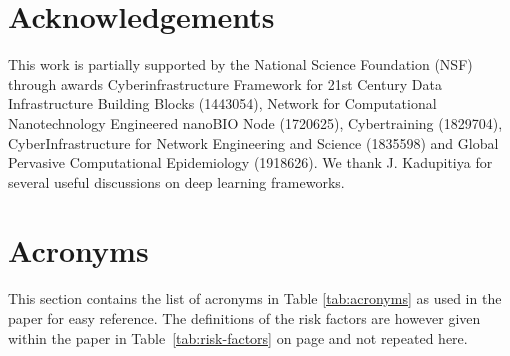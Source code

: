 \documentclass[a4paper, inpress]{jds} %
\renewcommand{\_}{%
    \textunderscore\hspace{0pt}%
}
\begin{document}
\section*{Acknowledgements}

This work is partially supported by the National Science Foundation
(NSF) through awards Cyberinfrastructure Framework for 21st Century
Data Infrastructure Building Blocks (1443054), Network for
Computational Nanotechnology Engineered nanoBIO Node (1720625),
Cybertraining (1829704), CyberInfrastructure for Network Engineering
and Science (1835598) and Global Pervasive Computational Epidemiology
(1918626).  We thank J. Kadupitiya for several useful discussions on
deep learning frameworks.

\clearpage

\section*{Acronyms}

This section contains the list of acronyms in Table \ref{tab:acronyms}
as used in the paper for easy reference. The definitions of the risk
factors are however given within the paper in
Table~\ref{tab:risk-factors} on page \pageref{tab:risk-factors} and
not repeated here.
\end{document}

